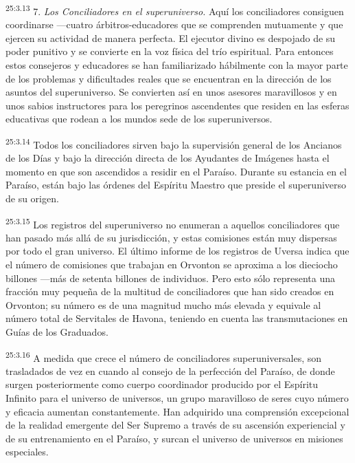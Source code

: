 \par
\textsuperscript{25:3.13} 7. \textit{Los Conciliadores en el superuniverso.} Aquí los conciliadores consiguen coordinarse ---cuatro árbitros-educadores que se comprenden mutuamente y que ejercen su actividad de manera perfecta. El ejecutor divino es despojado de su poder punitivo y se convierte en la voz física del trío espiritual. Para entonces estos consejeros y educadores se han familiarizado hábilmente con la mayor parte de los problemas y dificultades reales que se encuentran en la dirección de los asuntos del superuniverso. Se convierten así en unos asesores maravillosos y en unos sabios instructores para los peregrinos ascendentes que residen en las esferas educativas que rodean a los mundos sede de los superuniversos.

\par
\textsuperscript{25:3.14} Todos los conciliadores sirven bajo la supervisión general de los Ancianos de los Días y bajo la dirección directa de los Ayudantes de Imágenes hasta el momento en que son ascendidos a residir en el Paraíso. Durante su estancia en el Paraíso, están bajo las órdenes del Espíritu Maestro que preside el superuniverso de su origen.

\par
\textsuperscript{25:3.15} Los registros del superuniverso no enumeran a aquellos conciliadores que han pasado más allá de su jurisdicción, y estas comisiones están muy dispersas por todo el gran universo. El último informe de los registros de Uversa indica que el número de comisiones que trabajan en Orvonton se aproxima a los dieciocho billones ---más de setenta billones de individuos. Pero esto sólo representa una fracción muy pequeña de la multitud de conciliadores que han sido creados en Orvonton; su número es de una magnitud mucho más elevada y equivale al número total de Servitales de Havona, teniendo en cuenta las transmutaciones en Guías de los Graduados.

\par
\textsuperscript{25:3.16} A medida que crece el número de conciliadores superuniversales, son trasladados de vez en cuando al consejo de la perfección del Paraíso, de donde surgen posteriormente como cuerpo coordinador producido por el Espíritu Infinito para el universo de universos, un grupo maravilloso de seres cuyo número y eficacia aumentan constantemente. Han adquirido una comprensión excepcional de la realidad emergente del Ser Supremo a través de su ascensión experiencial y de su entrenamiento en el Paraíso, y surcan el universo de universos en misiones especiales.

